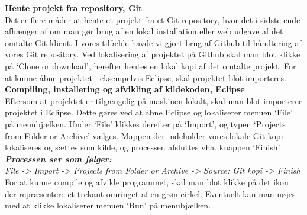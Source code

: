 \noindent \textbf{Hente projekt fra repository, Git}\\
Det er flere måder at hente et projekt fra et Git repository, hvor det i sidste ende afhænger af om man gør brug af en lokal installation eller web udgave af det omtalte Git klient. I vores tilfælde havde vi gjort brug af Github til håndtering af vores Git repository. Ved lokalisering af projektet på Github skal man blot klikke på ‘Clone or download’, herefter hentes en lokal kopi af det omtalte projekt. For at kunne åbne projektet i eksempelvis Eclipse, skal projektet blot importeres.\\

\noindent \textbf{Compiling, installering og afvikling af kildekoden, Eclipse}\\
Eftersom at projektet er tilgængelig på maskinen lokalt, skal man blot importerer projektet i Eclipse. Dette gøres ved at åbne Eclipse og lokaliserer menuen ‘File’ på menubjælken. Under ‘File’ klikkes derefter på ‘Import’, og typen ‘Projects from Folder or Archive’ vælges. Mappen der indeholder vores lokale Git kopi lokaliseres og sættes som kilde, og processen afsluttes vha. knappen ‘Finish’.\\

\noindent \textbf{\textit{Processen ser som følger:}}\\
\textit{File -> Import -> Projects from Folder or Archive -> Source: Git kopi -> Finish}\\

\noindent For at kunne compile og afvikle programmet, skal man blot klikke på det ikon der repræsentere et trekant omringet af en grøn cirkel. Eventuelt kan man nøjes med at klikke lokaliserer menuen ‘Run’ på menubjælken.
